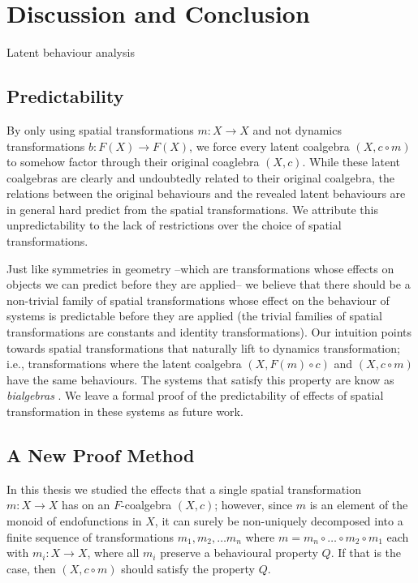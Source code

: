 \chapter{Discussion and Conclusion}
Latent behaviour analysis 

\section{Predictability} 
By only using spatial transformations $m\colon X\rightarrow X$ and not dynamics transformations $b\colon F(X)\rightarrow F(X)$, we force every latent coalgebra $(X,c\circ m)$ to somehow factor through their original coaglebra $(X,c)$. While these latent coalgebras are clearly and undoubtedly related to their original coalgebra, the relations between the original behaviours and the revealed latent behaviours are in general hard predict from the spatial transformations. We attribute this unpredictability to the lack of restrictions over the choice of spatial transformations. 

Just like symmetries in geometry --which are transformations whose effects on objects we can predict before they are applied-- we believe that there should be a non-trivial family of spatial transformations whose effect on the behaviour of systems is predictable before they are applied (the trivial families of spatial transformations are constants and identity transformations). Our intuition points towards spatial transformations that naturally lift to dynamics transformation; i.e., transformations where the latent coalgebra $(X,F(m)\circ c)$ and $(X,c\circ m)$ have the same behaviours. The systems that satisfy this property are know as \emph{bialgebras} \cite{JacobsBook}. We leave a formal proof of the predictability of effects of spatial transformation in these systems as future work.

\section{A New Proof Method}
In this thesis we studied the effects that a single spatial transformation $m\colon X\rightarrow X$ has on an $F$-coalgebra $(X,c)$; however, since $m$ is an element of the monoid of endofunctions in $X$, it can surely be non-uniquely decomposed  into a finite sequence of transformations $m_1, m_2, \ldots m_n$ where $m=m_n\circ\ldots \circ m_2\circ m_1$ each with $m_i\colon X\rightarrow X$, where all $m_i$ preserve a behavioural property $Q$. If that is the case, then $(X,c\circ m)$ should satisfy the property $Q$.

